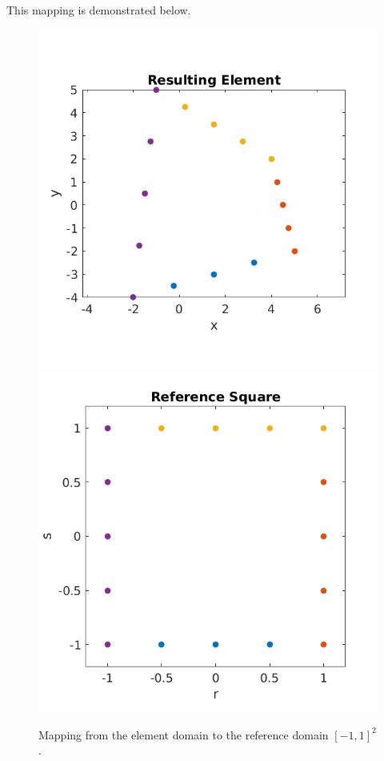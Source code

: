 \documentclass{article}
\begin{document}
This mapping is demonstrated below.

\begin{figure}[H]
  \centering
  \includegraphics[scale=0.5]{media/5-1-xy.png}
  \includegraphics[scale=0.5]{media/5-1-rs.png}
  
  \caption{Mapping from the element domain to the reference domain $[-1,1]^2$.}
  \label{fig:spatDer}
\end{figure}
\end{document}
